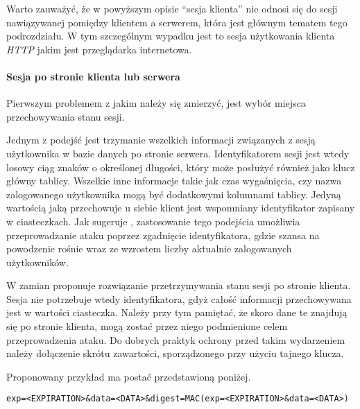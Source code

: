 \documentclass[11pt]{aghdpl}
\begin{document}
Warto zauważyć, że w powyższym opisie ``sesja klienta'' nie odnosi się do sesji nawiązywanej pomiędzy klientem a serwerem, która jest głównym tematem tego podrozdziału. W tym szczególnym wypadku jest to sesja użytkowania klienta \emph{HTTP} jakim jest przeglądarka internetowa.

\paragraph{Sesja po stronie klienta lub serwera}

Pierwszym problemem z jakim należy się zmierzyć, jest wybór miejsca przechowywania stanu sesji. 

Jednym z podejść jest trzymanie wszelkich informacji związanych z sesją użytkownika w bazie danych po stronie serwera. Identyfikatorem sesji jest wtedy losowy ciąg znaków o określonej długości, który może posłużyć również jako klucz główny tablicy. Wszelkie inne informacje takie jak czas wygaśnięcia, czy nazwa zalogowanego użytkownika mogą być dodatkowymi kolumnami tablicy. Jedyną wartością jaką przechowuje u siebie klient jest wspomniany identyfikator zapisany w ciasteczkach. Jak sugeruje \cite{ClAu}, zastosowanie tego podejścia umożliwia przeprowadzanie ataku poprzez zgadnięcie identyfikatora, gdzie szansa na powodzenie rośnie wraz ze wzrostem liczby aktualnie zalogowanych użytkowników.

W zamian \cite{ClAu} proponuje rozwiązanie przetrzymywania stanu sesji po stronie klienta. Sesja nie potrzebuje wtedy identyfikatora, gdyż całość informacji przechowywana jest w wartości ciasteczka. Należy przy tym pamiętać, że skoro dane te znajdują się po stronie klienta, mogą zostać przez niego podmienione celem przeprowadzenia ataku. Do dobrych praktyk ochrony przed takim wydarzeniem należy dołączenie skrótu zawartości, sporządzonego przy użyciu tajnego klucza.

Proponowany przykład ma postać przedstawioną poniżej.
\begin{lstlisting}
exp=<EXPIRATION>&data=<DATA>&digest=MAC(exp=<EXPIRATION>&data=<DATA>)
\end{lstlisting}
\end{document}
